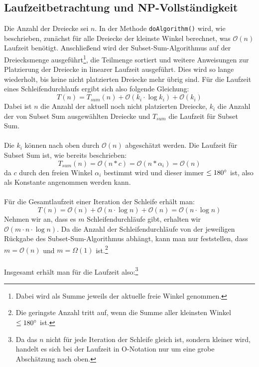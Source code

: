\documentclass[a4paper, notitlepage, 12pt]{scrartcl}
\begin{document}
 \subsection{Laufzeitbetrachtung und NP-Vollständigkeit}
 Die Anzahl der Dreiecke sei $n$. In der Methode \texttt{doAlgorithm()} wird, wie beschrieben, zunächst für alle Dreiecke der kleinste Winkel berechnet, was $\mathcal{O}(n)$ Laufzeit benötigt. Anschließend wird der Subset-Sum-Algorithmus auf der Dreiecksmenge ausgeführt\footnote{Dabei wird als Summe jeweils der aktuelle freie Winkel genommen.}, die Teilmenge sortiert und weitere Anweisungen zur Platzierung der Dreiecke in linearer Laufzeit ausgeführt. Dies wird so lange wiederholt, bis keine nicht platzierten Dreiecke mehr übrig sind. Für die Laufzeit eines Schleifendurchlaufs ergibt sich also folgende Gleichung:
 \begin{equation}
 T(n) = T_{sum}(n) + \mathcal{O}(k_i \cdot \log k_i) + \mathcal{O}(k_i)
 \end{equation}
Dabei ist $n$ die Anzahl der aktuell noch nicht platzierten Dreiecke, $k_i$ die Anzahl der von Subset Sum ausgewählten Dreiecke und $T_{sum}$ die Laufzeit für Subset Sum. \\ \\
Die $k_i$ können nach oben durch $\mathcal{O}(n)$ abgeschätzt werden. Die Laufzeit für Subset Sum ist, wie bereits beschrieben:
\begin{equation}
T_{sum}(n) = \mathcal{O}(n * c) = \mathcal{O}(n * \alpha_i) = \mathcal{O}(n)
\end{equation}
da $c$ durch den freien Winkel $\alpha_i$ bestimmt wird und dieser immer $\leq 180\degree$ ist, also als Konstante angenommen werden kann. \\ \\
Für die Gesamtlaufzeit einer Iteration der Schleife erhält man:
 \begin{equation}
T(n) = \mathcal{O}(n) + \mathcal{O}(n \cdot \log n) + \mathcal{O}(n) = \mathcal{O}(n \cdot \log n)
\end{equation}
Nehmen wir an, dass es $m$ Schleifendurchläufe gibt, erhalten wir $\mathcal{O}(m \cdot n \cdot \log n)$. Da die Anzahl der Schleifendurchläufe von der jeweiligen Rückgabe des Subset-Sum-Algorithmus abhängt, kann man nur feststellen, dass $m = \mathcal{O}(n)$ und $m = \Omega(1)$ ist.\footnote{Die geringste Anzahl tritt auf, wenn die Summe aller kleinsten Winkel $\leq 180\degree$ ist.} \\ \\
Insgesamt erhält man für die Laufzeit also:\footnote{Da das $n$ nicht für jede Iteration der Schleife gleich ist, sondern kleiner wird, handelt es sich bei der Laufzeit in O-Notation nur um eine grobe Abschätzung nach oben.}
\end{document}
